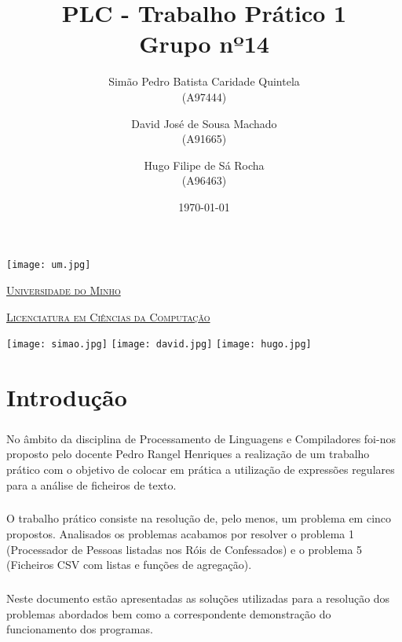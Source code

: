 \documentclass[11pt,a4paper]{report}
\title{PLC - Trabalho Prático 1\\
	\large Grupo nº14}
\author{Simão Pedro Batista Caridade Quintela \\ (A97444) 
        \and David José de Sousa Machado \\ (A91665)
        \and Hugo Filipe de Sá Rocha \\ (A96463)
       } %
\date{\today} %
\begin{document}
	\begin{minipage}{0.9\linewidth}
        \centering
		\texttt{[image: um.jpg]}\par\vspace{1 cm}
		\href{https://www.uminho.pt/PT}
		{\scshape\LARGE Universidade do Minho} \par
		\vspace{0.6cm}
		\href{https://lcc.di.uminho.pt}
		{\scshape\Large Licenciatura em Ciências da Computação} \par
		\maketitle
		
		\texttt{[image: simao.jpg]}
	    \texttt{[image: david.jpg]}	
        \texttt{[image: hugo.jpg]}
        
		
	\end{minipage}
	
	\tableofcontents
	
	\pagebreak
	
	\chapter{Introdução}
% 
    \paragraph{}
    No âmbito da disciplina de Processamento de Linguagens e Compiladores foi-nos proposto pelo docente Pedro Rangel Henriques a realização de um trabalho prático com o objetivo de colocar em prática a utilização de expressões regulares para a análise de ficheiros de texto.

    \paragraph{}
    O trabalho prático consiste na resolução de, pelo menos, um problema em cinco propostos. Analisados os problemas acabamos por resolver o problema 1 (Processador de Pessoas listadas nos Róis de Confessados) e o problema 5 (Ficheiros CSV com listas e funções de agregação).

    \paragraph{}
    Neste documento estão apresentadas as soluções utilizadas para a resolução dos problemas abordados bem como a correspondente demonstração do funcionamento dos programas. 
\end{document}
